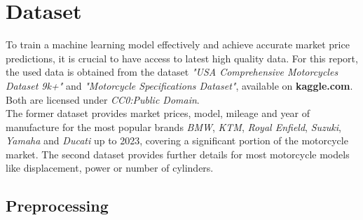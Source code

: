 \section{Dataset}
\label{sec:Dataset}

To train a machine learning model effectively and achieve accurate market price predictions, it is crucial to have access to latest high quality data. 
For this report, the used data is obtained from the dataset \textit{"USA Comprehensive Motorcycles Dataset 9k+"}\cite{kaggle_1}
and \textit{"Motorcycle Specifications Dataset"}\cite{kaggle_2}, available on \textbf{kaggle.com}. Both are licensed under \textit{CC0:Public Domain}.\\
The former dataset provides market prices, model, mileage and year of manufacture for the most popular brands \textit{BMW}, \textit{KTM}, \textit{Royal Enfield}, \textit{Suzuki}, \textit{Yamaha} and \textit{Ducati}
up to 2023, covering a significant portion of the motorcycle market. The second dataset provides further 
details for most motorcycle models like displacement, power or number of cylinders.

\subsection{Preprocessing}

